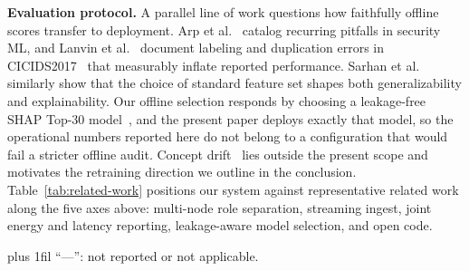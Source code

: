 \documentclass[runningheads]{llncs}
\newcommand{\tabnote}[1]{%
  \vspace{4pt}\par\noindent
  \begin{minipage}{\textwidth}%
    \footnotesize\parindent=0pt\leftskip=0pt\rightskip=0pt\parfillskip=0pt plus 1fil\relax
    #1%
  \end{minipage}}
\begin{document}
\textbf{Evaluation protocol.} A parallel line of work questions how faithfully offline scores transfer to deployment. Arp et al.~\cite{arp2022dosdonts} catalog recurring pitfalls in security ML, and Lanvin et al.~\cite{lanvin2023errors} document labeling and duplication errors in CICIDS2017~\cite{sharafaldin2018toward} that measurably inflate reported performance. Sarhan et al.~\cite{sarhan2022explainable} similarly show that the choice of standard feature set shapes both generalizability and explainability. Our offline selection responds by choosing a leakage-free SHAP Top-30 model~\cite{lundberg2017unified}, and the present paper deploys exactly that model, so the operational numbers reported here do not belong to a configuration that would fail a stricter offline audit. Concept drift~\cite{gama2014survey} lies outside the present scope and motivates the retraining direction we outline in the conclusion. Table~\ref{tab:related-work} positions our system against representative related work along the five axes above: multi-node role separation, streaming ingest, joint energy and latency reporting, leakage-aware model selection, and open code.

\begin{table}[htbp]
  \caption{Capability comparison with prior edge IDS deployments}
  \label{tab:related-work}
  \centering
  \small

  \tabnote{``---'': not reported or not applicable.}
\end{table}
\end{document}

